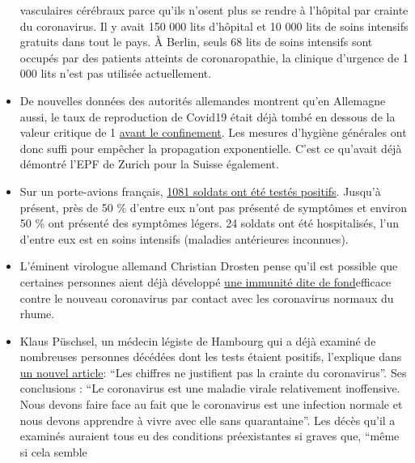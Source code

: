 \begin{itemize}
  vasculaires cérébraux parce qu'ils n'osent plus se rendre à l'hôpital
  par crainte du coronavirus. Il y avait 150 000 lits d'hôpital et 10
  000 lits de soins intensifs gratuits dans tout le pays. À Berlin,
  seuls 68 lits de soins intensifs sont occupés par des patients
  atteints de coronaropathie, la clinique d'urgence de 1 000 lits n'est
  pas utilisée actuellement.
\item
  De nouvelles données des autorités allemandes montrent qu'en Allemagne
  aussi, le taux de reproduction de Covid19 était déjà tombé en dessous
  de la valeur critique de 1
  \href{https://www.rki.de/DE/Content/Infekt/EpidBull/Archiv/2020/Ausgaben/17_20_SARS-CoV2_vorab.pdf}{avant
  le confinement}. Les mesures d'hygiène générales ont donc suffi pour
  empêcher la propagation exponentielle. C'est ce qu'avait déjà démontré
  l'EPF de Zurich pour la Suisse également.
\item
  Sur un porte-avions français,
  \href{https://www.ouest-france.fr/sante/virus/coronavirus/coronavirus-au-moins-940-marins-positifs-sur-le-charles-de-gaulle-et-son-escorte-6810816}{1081
  soldats ont été testés positifs}. Jusqu'à présent, près de 50 \%
  d'entre eux n'ont pas présenté de symptômes et environ 50 \% ont
  présenté des symptômes légers. 24 soldats ont été hospitalisés, l'un
  d'entre eux est en soins intensifs (maladies antérieures inconnues).
\item
  L'éminent virologue allemand Christian Drosten pense qu'il est
  possible que certaines personnes aient déjà développé
  \href{https://www.watson.de/!324026684}{une immunité dite de
  fond}efficace contre le nouveau coronavirus par contact avec les
  coronavirus normaux du rhume.
\item
  Klaus Püschsel, un médecin légiste de Hambourg qui a déjà examiné de
  nombreuses personnes décédées dont les tests étaient positifs,
  l'explique dans
  \href{https://www.abendblatt.de/hamburg/article228908865/hamburg-corona-virus-uke-infektion-covid-19-pueschel-coronavirus-krise-patienten-impfstoff-immunitaet-krankenhaeuser-kontaktverbot-kliniken-infektionsrate-krankheit-pandemie-test-lungenkrankheit-sars-cov-epidemie-sars-cov-2.html}{un
  nouvel article}: ``Les chiffres ne justifient pas la crainte du
  coronavirus''. Ses conclusions : ``Le coronavirus est une maladie
  virale relativement inoffensive. Nous devons faire face au fait que le
  coronavirus est une infection normale et nous devons apprendre à vivre
  avec elle sans quarantaine''. Les décès qu'il a examinés auraient tous
  eu des conditions préexistantes si graves que, ``même si cela semble

\end{itemize}
